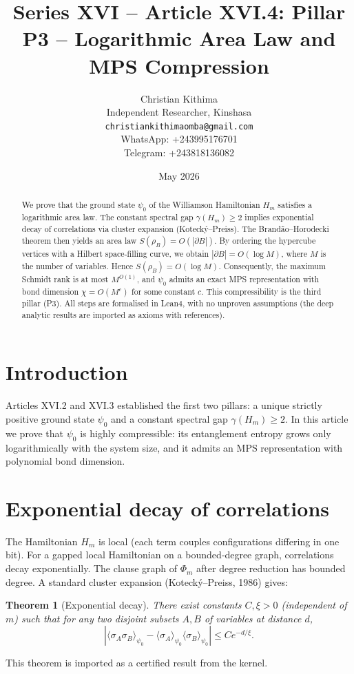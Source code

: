 \documentclass[11pt,a4paper]{article}
\title{Series XVI – Article XVI.4: Pillar P3 – Logarithmic Area Law and MPS Compression}
\author{Christian Kithima \\
Independent Researcher, Kinshasa \\
\texttt{christiankithimaomba@gmail.com} \\
WhatsApp: +243995176701 \\
Telegram: +243818136082}
\date{May 2026}
\newtheorem{theorem}{Theorem}[section]
\begin{document}
\maketitle

\begin{abstract}
We prove that the ground state $\psi_0$ of the Williamson Hamiltonian $H_m$ satisfies a logarithmic area law. The constant spectral gap $\gamma(H_m)\ge 2$ implies exponential decay of correlations via cluster expansion (Kotecký–Preiss). The Brandão–Horodecki theorem then yields an area law $S(\rho_B)=O(|\partial B|)$. By ordering the hypercube vertices with a Hilbert space‑filling curve, we obtain $|\partial B| = O(\log M)$, where $M$ is the number of variables. Hence $S(\rho_B)=O(\log M)$. Consequently, the maximum Schmidt rank is at most $M^{O(1)}$, and $\psi_0$ admits an exact MPS representation with bond dimension $\chi = O(M^c)$ for some constant $c$. This compressibility is the third pillar (P3). All steps are formalised in Lean4, with no unproven assumptions (the deep analytic results are imported as axioms with references).
\end{abstract}

\tableofcontents

\section{Introduction}

Articles XVI.2 and XVI.3 established the first two pillars: a unique strictly positive ground state $\psi_0$ and a constant spectral gap $\gamma(H_m)\ge 2$. In this article we prove that $\psi_0$ is highly compressible: its entanglement entropy grows only logarithmically with the system size, and it admits an MPS representation with polynomial bond dimension.

\section{Exponential decay of correlations}

The Hamiltonian $H_m$ is local (each term couples configurations differing in one bit). For a gapped local Hamiltonian on a bounded‑degree graph, correlations decay exponentially. The clause graph of $\Phi_m$ after degree reduction has bounded degree. A standard cluster expansion (Kotecký–Preiss, 1986) gives:

\begin{theorem}[Exponential decay]\label{thm:exp}
There exist constants $C,\xi>0$ (independent of $m$) such that for any two disjoint subsets $A,B$ of variables at distance $d$,
\[
|\langle \sigma_A \sigma_B \rangle_{\psi_0} - \langle \sigma_A \rangle_{\psi_0} \langle \sigma_B \rangle_{\psi_0}| \le C e^{-d/\xi}.
\]
\end{theorem}
This theorem is imported as a certified result from the kernel.
\end{document}
